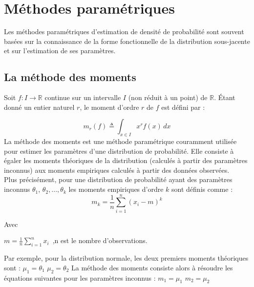 \section{Méthodes paramétriques }

Les méthodes paramétriques d'estimation de densité de probabilité sont souvent basées sur la connaissance de la forme fonctionnelle de la distribution sous-jacente et sur l'estimation de ses paramètres.
\subsection{La méthode des moments}
Soit $f: I \rightarrow \mathbb{R}$ continue sur un intervalle $I$ (non réduit à un point) de $\mathbb{R}$. Étant donné un entier naturel $r$, le moment d'ordre $r$ de $f$ est défini par :

\begin{equation}
m_r(f) \triangleq {\int_{x\in I}} x^r f(x)\,dx
\end{equation}
La méthode des moments  est une méthode paramétrique couramment utilisée pour estimer les paramètres d'une distribution de probabilité. Elle consiste à égaler les moments théoriques de la distribution (calculés à partir des paramètres inconnus) aux moments empiriques calculés à partir des données observées.\\
Plus précisément, pour une distribution de probabilité ayant des paramètres inconnus $\theta_1$, $\theta_2,...,\theta_k$  les moments empiriques d'ordre $k$ sont définis comme :
\begin{equation}
m_k = \frac{1}{n} \sum_{i=1}^n (x_i - m)^k
\end{equation}
 
Avec

$m = \frac{1}{n} \sum_{i=1}^n x_i$
\,,n est le nombre d'observations.

Par exemple, pour la distribution normale, les deux premiers moments théoriques sont :
\newline
$\mu_1 = \theta_1$
\newline
$\mu_2 = \theta_2$
\newline
\newline
La méthode des moments consiste alors à résoudre les équations suivantes pour les paramètres inconnus :
\newline
$m_1 = \mu_1$
\newline
$m_2 = \mu_2$
